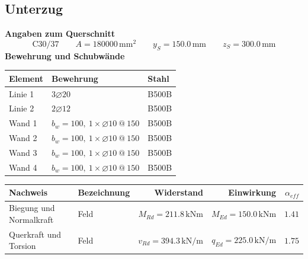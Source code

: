 \documentclass[11pt,a4paper]{article}
\begin{document}
\subsection{Unterzug}
\noindent\textbf{Angaben zum Querschnitt}
\begin{equation*}
\text{C30/37} \qquad A = 180000\,\mathrm{mm}^2 \qquad y_S = 150.0\,\mathrm{mm} \qquad z_S = 300.0\,\mathrm{mm}
\end{equation*}
\noindent\textbf{Bewehrung und Schubwände}
\begin{longtable}{lll}
\hline
Element & Bewehrung & Stahl \\
\hline
\endhead
Linie 1 & $3 \varnothing 20$ & B500B \\
Linie 2 & $2 \varnothing 12$ & B500B \\
Wand 1 & $b_w = 100,\ 1 \times \varnothing 10\ @\ 150$ & B500B \\
Wand 2 & $b_w = 100,\ 1 \times \varnothing 10\ @\ 150$ & B500B \\
Wand 3 & $b_w = 100,\ 1 \times \varnothing 10\ @\ 150$ & B500B \\
Wand 4 & $b_w = 100,\ 1 \times \varnothing 10\ @\ 150$ & B500B \\
\hline
\end{longtable}
\begin{xltabular}{\linewidth}{>{\raggedright\arraybackslash}X>{\raggedright\arraybackslash}Xrrr}
\hline
Nachweis & Bezeichnung & Widerstand & Einwirkung & $\alpha_{eff}$ \\
\hline
\endhead
Biegung und Normalkraft & Feld & $M_{Rd} = 211.8\,\mathrm{kNm}$ & $M_{Ed} = 150.0\,\mathrm{kNm}$ & $1.41$ \\
Querkraft und Torsion & Feld & $v_{Rd} = 394.3\,\mathrm{kN}/\mathrm{m}$ & $q_{Ed} = 225.0\,\mathrm{kN}/\mathrm{m}$ & $1.75$ \\
\hline
\end{xltabular}
\end{document}
